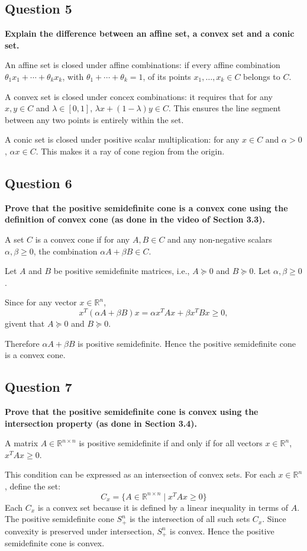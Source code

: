 \subsection*{Question 5}
\textbf{Explain the diﬀerence between an affine set, a convex set and a conic set.}

An affine set is closed under affine combinations: if every affine combination $\theta_1 x_1 + \cdots+ \theta_k x_k$, with $\theta_1 + \cdots+\theta_k = 1$, of its points  $x_1, \dots, x_k \in C$ belongs to $C$. 

A convex set is closed under concex combinations: it requires that for any \( x, y \in C \) and \( \lambda \in [0,1] \), \( \lambda x + (1-\lambda)y \in C \). This ensures the line segment between any two points is entirely within the set.

A conic set is closed under positive scalar multiplication: for any \( x \in C \) and \( \alpha > 0 \), \( \alpha x \in C \). This makes it a ray of cone region from the origin. 

\subsection*{Question 6}
\textbf{Prove that the positive semideﬁnite cone is a convex cone using the deﬁnition of convex cone (as done in the video of Section 3.3).}

A set \( C \) is a convex cone if for any \( A, B \in C \) and any non-negative scalars \( \alpha, \beta \geq 0 \), the combination \( \alpha A + \beta B \in C \).

Let \( A \) and \( B \) be positive semidefinite matrices, i.e., \( A \succeq 0 \) and \( B \succeq 0 \). Let \( \alpha, \beta \geq 0 \).

Since for any vector \( x \in \mathbb{R}^n \),
\[
x^T (\alpha A + \beta B) x = \alpha x^T A x + \beta x^T B x \geq 0,
\]
givent that \( A \succeq 0 \) and \( B \succeq 0 \).

Therefore \( \alpha A + \beta B \) is positive semidefinite. Hence the positive semidefinite cone is a convex cone.

\subsection*{Question 7}
\textbf{Prove that the positive semideﬁnite cone is convex using the intersection property (as done in Section 3.4).}

A matrix \( A \in \mathbb{R}^{n \times n} \) is positive semidefinite if and only if for all vectors \( x \in \mathbb{R}^n \), \( x^T A x \geq 0 \).

This condition can be expressed as an intersection of convex sets. For each \( x \in \mathbb{R}^n \), define the set:
\[
C_x = \{ A \in \mathbb{R}^{n \times n} \mid x^T A x \geq 0 \}
\]
Each \( C_x \) is a convex set because it is defined by a linear inequality in terms of \( A \). The positive semidefinite cone \( S_+^n \) is the intersection of all such sets \( C_x \). Since convexity is preserved under intersection, \( S_+^n \) is convex. Hence the positive semidefinite cone is convex.
